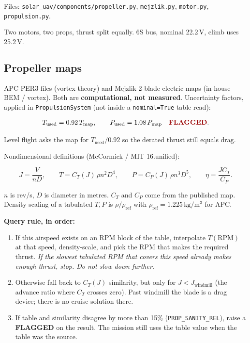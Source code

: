 \documentclass[11pt,letterpaper]{article}
\newcommand{\flag}{\textcolor{red!60!black}{\textbf{FLAGGED}}}
\newcommand{\code}[1]{\texttt{#1}}
\begin{document}
Files: \code{solar\_uav/components/propeller.py}, \code{mejzlik.py}, \code{motor.py}, \code{propulsion.py}.

Two motors, two props, thrust split equally. 6S bus, nominal 22.2\,V, climb uses 25.2\,V.

\subsection{Propeller maps}

APC PER3 files (vortex theory) and Mejzlik 2-blade electric maps (in-house BEM / vortex). Both are \textbf{computational, not measured}. Uncertainty factors, applied in \code{PropulsionSystem} (not inside a \code{nominal=True} table read):

\begin{equation}
  T_\mathrm{used} = 0.92\, T_\mathrm{map}, \qquad
  P_\mathrm{used} = 1.08\, P_\mathrm{map}
  \quad \text{\flag{}}.
\end{equation}

Level flight asks the map for $T_\mathrm{need}/0.92$ so the derated thrust still equals drag.

Nondimensional definitions (McCormick / MIT 16.unified):

\begin{equation}
  J = \frac{V}{n D}, \qquad
  T = C_T(J)\, \rho n^2 D^4, \qquad
  P = C_P(J)\, \rho n^3 D^5, \qquad
  \eta = \frac{J C_T}{C_P}.
\end{equation}

$n$ is rev/s, $D$ is diameter in metres. $C_T$ and $C_P$ come from the published map. Density scaling of a tabulated $T,P$ is $\rho/\rho_\mathrm{ref}$ with $\rho_\mathrm{ref} = 1.225\,\mathrm{kg/m^3}$ for APC.

\textbf{Query rule, in order:}

\begin{enumerate}
  \item If this airspeed exists on an RPM block of the table, interpolate $T(\mathrm{RPM})$ at that speed, density-scale, and pick the RPM that makes the required thrust. \emph{If the slowest tabulated RPM that covers this speed already makes enough thrust, stop. Do not slow down further.}
  \item Otherwise fall back to $C_T(J)$ similarity, but only for $J < J_\mathrm{windmill}$ (the advance ratio where $C_T$ crosses zero). Past windmill the blade is a drag device; there is no cruise solution there.
  \item If table and similarity disagree by more than 15\% (\code{PROP\_SANITY\_REL}), raise a \flag{} on the result. The mission still uses the table value when the table was the source.
\end{enumerate}
\end{document}
